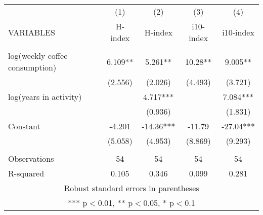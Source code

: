 \documentclass[]{article}
\begin{document}
\begin{tabular}{lcccc} \hline
 & (1) & (2) & (3) & (4) \\
VARIABLES & H-index & H-index & i10-index & i10-index \\ \hline
 &  &  &  &  \\
log(weekly coffee consumption) & 6.109** & 5.261** & 10.28** & 9.005** \\
 & (2.556) & (2.026) & (4.493) & (3.721) \\
log(years in activity) &  & 4.717*** &  & 7.084*** \\
 &  & (0.936) &  & (1.831) \\
Constant & -4.201 & -14.36*** & -11.79 & -27.04*** \\
 & (5.058) & (4.953) & (8.869) & (9.293) \\
 &  &  &  &  \\
Observations & 54 & 54 & 54 & 54 \\
 R-squared & 0.105 & 0.346 & 0.099 & 0.281 \\ \hline
\multicolumn{5}{c}{ Robust standard errors in parentheses} \\
\multicolumn{5}{c}{ *** p$<$0.01, ** p$<$0.05, * p$<$0.1} \\
\end{tabular}
\end{document}
